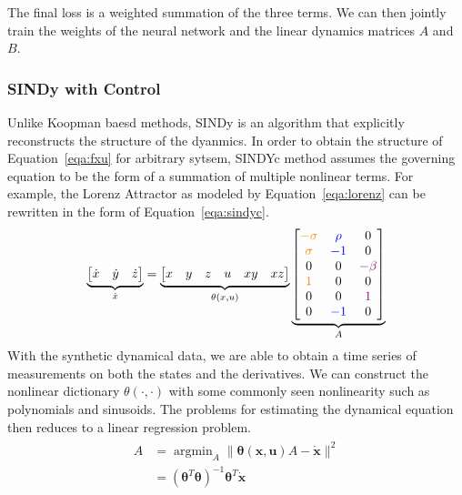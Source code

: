 \documentclass[10pt,twocolumn]{article}
\DeclareMathOperator*{\argmin}{argmin}
\begin{document}
The final loss is a weighted summation of the three terms. We can then jointly train the
weights of the neural network and the linear dynamics matrices $A$ and $B$.

\subsubsection{SINDy with Control \cite{sindyc}}

Unlike Koopman baesd methods, SINDy is an algorithm that explicitly reconstructs the
structure of the dyanmics. In order to obtain the structure of Equation~\ref{eqa:fxu}
for arbitrary sytsem,
SINDYc method assumes the governing equation to be the form of a summation of
multiple nonlinear terms. For example, the Lorenz Attractor as modeled by
Equation~\ref{eqa:lorenz} can be rewritten in the form of Equation~\ref{eqa:sindyc}.
\begin{gather}\label{eqa:lorenz_sindy}
  \underbrace{
    \begin{bmatrix}
      \dot{x} & \dot{y} & \dot{z}
    \end{bmatrix}
  }_{\dot{x}}
  =
  \underbrace{
    \begin{bmatrix}
      x & y & z & u & xy & xz
    \end{bmatrix}
  }_{\theta(x, u)}
  \underbrace{
    \begin{bmatrix}
      {\color{orange}-\sigma} & {\color{blue}\rho} & 0 \\
      {\color{orange}\sigma} & {\color{blue}-1} & 0 \\
      0 & 0 & {\color{violet}-\beta} \\
      {\color{orange}1} & 0 & 0 \\
      0 & 0 & {\color{violet}1} \\
      0 & {\color{blue}-1} & 0
    \end{bmatrix}
  }_{A}
\end{gather}
With the synthetic dynamical data, we are able to obtain a time series of measurements
on both the states and the derivatives. We can construct the nonlinear dictionary
$\theta(\cdot, \cdot)$ with some commonly seen nonlinearity such as polynomials and
sinusoids. The problems for estimating the dynamical equation then reduces to a
linear regression problem.
\begin{gather}
  \begin{aligned}
    A &=  \argmin_A \| \bm{\theta}(\bm{x}, \bm{u})A - \dot{\bm{x}} \|^2 \\
      &= (\bm{\theta}^T \bm{\theta})^{-1}\bm{\theta}^T \dot{\bm{x}}
  \end{aligned}
\end{gather}
\end{document}
